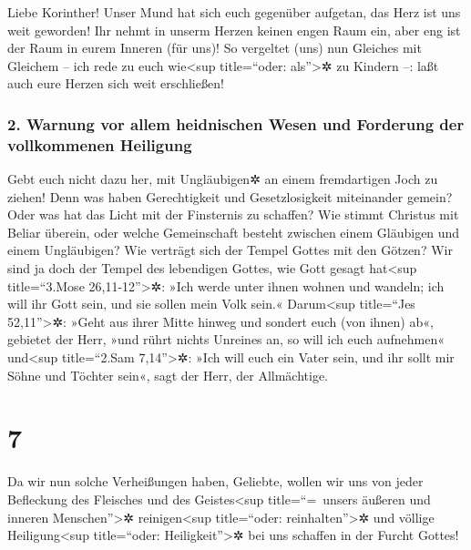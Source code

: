  Liebe Korinther! Unser Mund hat sich euch gegenüber
aufgetan, das Herz ist uns weit geworden!  Ihr nehmt in
unserm Herzen keinen engen Raum ein, aber eng ist der Raum in eurem
Inneren (für uns)!  So vergeltet (uns) nun Gleiches mit
Gleichem -- ich rede zu euch wie\textless sup title=``oder:
als''\textgreater✲ zu Kindern --: laßt auch eure Herzen sich weit
erschließen!

\hypertarget{warnung-vor-allem-heidnischen-wesen-und-forderung-der-vollkommenen-heiligung}{%
\subsubsection{2. Warnung vor allem heidnischen Wesen und Forderung der
vollkommenen
Heiligung}\label{warnung-vor-allem-heidnischen-wesen-und-forderung-der-vollkommenen-heiligung}}

 Gebt euch nicht dazu her, mit Ungläubigen✲ an einem
fremdartigen Joch zu ziehen! Denn was haben Gerechtigkeit und
Gesetzlosigkeit miteinander gemein? Oder was hat das Licht mit der
Finsternis zu schaffen?  Wie stimmt Christus mit Beliar
überein, oder welche Gemeinschaft besteht zwischen einem Gläubigen und
einem Ungläubigen?  Wie verträgt sich der Tempel Gottes
mit den Götzen? Wir sind ja doch der Tempel des lebendigen Gottes, wie
Gott gesagt hat\textless sup title=``3.Mose 26,11-12''\textgreater✲:
»Ich werde unter ihnen wohnen und wandeln; ich will ihr Gott sein, und
sie sollen mein Volk sein.«  Darum\textless sup
title=``Jes 52,11''\textgreater✲: »Geht aus ihrer Mitte hinweg und
sondert euch (von ihnen) ab«, gebietet der Herr, »und rührt nichts
Unreines an, so will ich euch aufnehmen« und\textless sup title=``2.Sam
7,14''\textgreater✲:  »Ich will euch ein Vater sein, und
ihr sollt mir Söhne und Töchter sein«, sagt der Herr, der Allmächtige.

\hypertarget{section-6}{%
\section{7}\label{section-6}}

 Da wir nun solche Verheißungen haben, Geliebte, wollen
wir uns von jeder Befleckung des Fleisches und des Geistes\textless sup
title=``=~unsers äußeren und inneren Menschen''\textgreater✲
reinigen\textless sup title=``oder: reinhalten''\textgreater✲ und
völlige Heiligung\textless sup title=``oder: Heiligkeit''\textgreater✲
bei uns schaffen in der Furcht Gottes!

